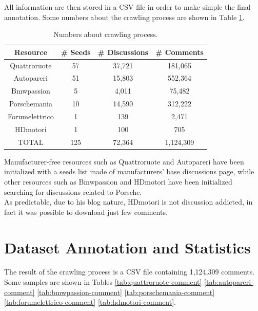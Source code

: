 All information are then stored in a \ac{CSV} file in order to make simple the final annotation. Some numbers about the crawling process are shown in Table \ref{table:numbers-crawl}.

\begin{table}[ht]
	\centering
	\begin{tabular}{| c | c | c | c | } 
		\hline
		\textbf{Resource} & \textbf{\# Seeds} & \textbf{\# Discussions} & \textbf{\# Comments} \\ %
		\hline
		\hline
		Quattroruote & 57 & 37,721 & 181,065 \\ %
		\hline
		Autopareri & 51 & 15,803 & 552,364 \\ %
		\hline
		Bmwpassion & 5 & 4,011 & 75,482
		\\ %
		\hline
		Porschemania & 10 & 14,590 & 312,222 \\ %
		\hline
		Forumelettrico & 1 & 139 & 2,471 \\ %
		\hline
		HDmotori & 1 & 100 & 705 \\ %
		\hline
		\hline
		TOTAL & 125 & 72,364 & 1,124,309 \\ %
		\hline
	\end{tabular}
	\caption{Numbers about crawling process.}
	\label{table:numbers-crawl}
\end{table}

Manufacturer-free resources such as Quattroruote and Autopareri have been initialized with a seeds list made of manufacturers' base discussions page, while other resources such as Bmwpassion and HDmotori have been initialized searching for discussions related to Porsche.\\
As predictable, due to his blog nature, HDmotori is not discussion addicted, in fact it was possible to download just few comments.



\section{Dataset Annotation and Statistics}

The result of the crawling process is a \ac{CSV} file containing 1,124,309 comments. Some samples are shown in Tables \ref{tab:quattroruote-comment} \ref{tab:autopareri-comment} \ref{tab:bmwpassion-comment} \ref{tab:porschemania-comment} \ref{tab:forumelettrico-comment} \ref{tab:hdmotori-comment}.

